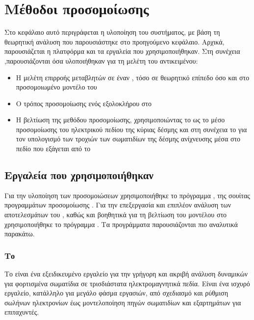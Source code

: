 \chapter{Μέθοδοι προσομοίωσης} \label{ch:simulation-methods}
Στο κεφάλαιο αυτό περιγράφεται η υλοποίηση του συστήματος, με βάση τη θεωρητική ανάλυση που παρουσιάστηκε στο προηγούμενο κεφάλαιο. 
Αρχικά, παρουσιάζεται η πλατφόρμα και τα εργαλεία που χρησιμοποιήθηκαν.
Στη συνέχεια ,παρουσιάζονται όσα υλοποιήθηκαν για τη μελέτη του αντικειμένου:
\begin{itemize}
\item Η μελέτη επιρροής μεταβλητών σε έναν , τόσο σε θεωρητικό επίπεδο όσο και στο προσομοιωμένο μοντέλο του 
\item Ο τρόπος προσομοίωσης ενός  εξολοκλήρου στο 
\item Η βελτίωση της μεθόδου προσομοίωσης, χρησιμοποιώντας το  ως το μέσο προσομοίωσης του ηλεκτρικού πεδίου της κύριας δέσμης και στη συνέχεια το  για τον υπολογισμό των τροχιών των σωματιδίων της δέσμης ανίχνευσης μέσα στο πεδίο που εξάγεται από το 
\end{itemize}

\section{Εργαλεία που χρησιμοποιήθηκαν}
Για την υλοποίηση των προσομοιώσεων χρησιμοποιήθηκε το πρόγραμμα , της σουίτας προγραμμάτων προσομοίωσης . 
Για την επεξεργασία και επιπλέον ανάλυση των αποτελεσμάτων του , καθώς και βοηθητικά για τη βελτίωση του μοντέλου στο  χρησιμοποιήθηκε το πρόγραμμα . 
Τα προγράμματα παρουσιάζονται πιο αναλυτικά παρακάτω.

\subsection{Το }

Το  είναι ένα εξειδικευμένο εργαλείο για την γρήγορη και ακριβή ανάλυση δυναμικών για φορτισμένα σωματίδια σε τρισδιάστατα ηλεκτρομαγνητικά πεδία.
Είναι ένα ισχυρό εργαλείο, κατάλληλο για μεγάλο φάσμα εργασιών, από σχεδιασμό  και ρύθμιση σωλήνων ηλεκτρονίων έως μοντελοποίηση πηγών σωματιδίων και εξαρτημάτων για επιταχυντές.

